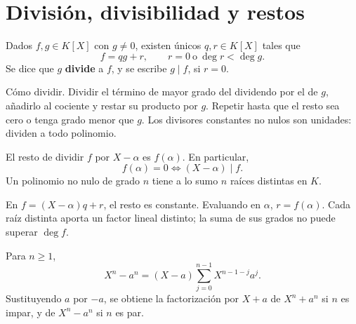 \section{División, divisibilidad y restos}
\begin{proposicion}[{title={Algoritmo de división}}]
Dados $f,g\in K[X]$ con $g\neq0$, existen únicos $q,r\in K[X]$ tales que
\[
f=qg+r,\qquad r=0\ \text{o}\ \deg r<\deg g.
\]
Se dice que $g$ \textbf{divide} a $f$, y se escribe $g\mid f$, si $r=0$.
\end{proposicion}
\begin{nota}{Cómo dividir.}
Dividir el término de mayor grado del dividendo por el de $g$,
añadirlo al cociente y restar su producto por $g$.
Repetir hasta que el resto sea cero o tenga grado menor que $g$.
Los divisores constantes no nulos son unidades: dividen a todo polinomio.
\end{nota}
\begin{proposicion}[{title={Teorema del resto y de la raíz}}]
El resto de dividir $f$ por $X-\alpha$ es $f(\alpha)$. En particular,
\[
f(\alpha)=0\iff (X-\alpha)\mid f.
\]
Un polinomio no nulo de grado $n$ tiene a lo sumo $n$ raíces distintas en $K$.
\end{proposicion}
\begin{demostracion}
En $f=(X-\alpha)q+r$, el resto es constante. Evaluando en $\alpha$,
$r=f(\alpha)$. Cada raíz distinta aporta un factor lineal distinto;
la suma de sus grados no puede superar $\deg f$.
\end{demostracion}
\begin{proposicion}[{title={Identidades útiles}}]
Para $n\geq1$,
\[
X^n-a^n=(X-a)\sum_{j=0}^{n-1}X^{n-1-j}a^j.
\]
Sustituyendo $a$ por $-a$, se obtiene la factorización por $X+a$
de $X^n+a^n$ si $n$ es impar, y de $X^n-a^n$ si $n$ es par.
\end{proposicion}
